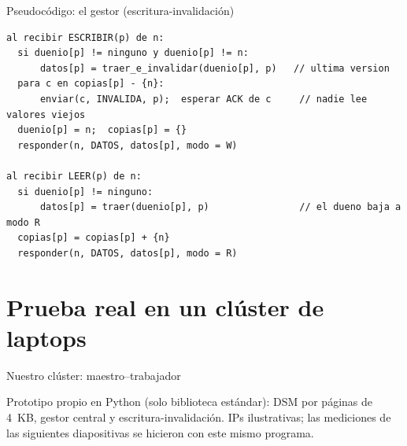 \documentclass[aspectratio=169,11pt]{beamer}
\newcommand{\exponente}{}
\newcommand{\seccion}[2]{\renewcommand{\exponente}{#2}\section{#1}}
\begin{document}
\begin{frame}[fragile]{Pseudocódigo: el gestor (escritura-invalidación)}
\begin{lstlisting}
al recibir ESCRIBIR(p) de n:
  si duenio[p] != ninguno y duenio[p] != n:
      datos[p] = traer_e_invalidar(duenio[p], p)   // ultima version
  para c en copias[p] - {n}:
      enviar(c, INVALIDA, p);  esperar ACK de c     // nadie lee valores viejos
  duenio[p] = n;  copias[p] = {}
  responder(n, DATOS, datos[p], modo = W)

al recibir LEER(p) de n:
  si duenio[p] != ninguno:
      datos[p] = traer(duenio[p], p)                // el dueno baja a modo R
  copias[p] = copias[p] + {n}
  responder(n, DATOS, datos[p], modo = R)
\end{lstlisting}
\end{frame}

\seccion{Prueba real en un clúster de laptops}{Christian}

\begin{frame}{Nuestro clúster: maestro--trabajador}
  \centering
  \par
  \vspace{.4em}
  {\footnotesize\color{tenue}Prototipo propio en Python (solo biblioteca estándar): DSM por páginas de 4~KB, gestor central y escritura-invalidación. IPs ilustrativas; las mediciones de las siguientes diapositivas se hicieron con este mismo programa.}
\end{frame}
\end{document}
